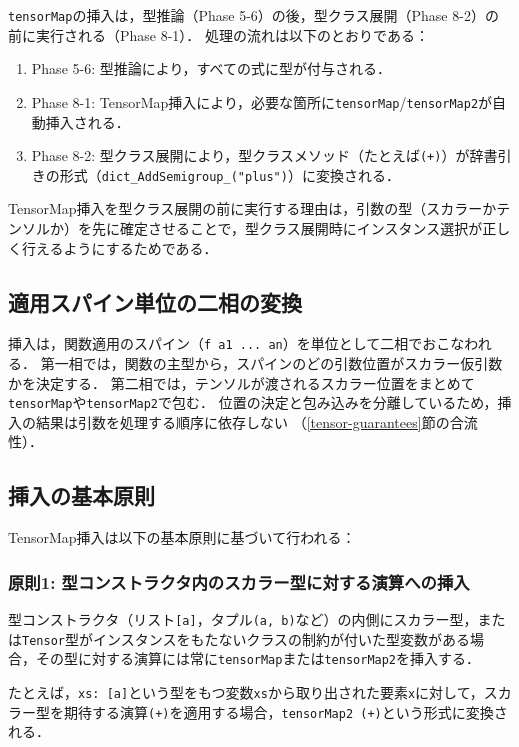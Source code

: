 \lstinline{tensorMap}の挿入は，型推論（Phase 5-6）の後，型クラス展開（Phase 8-2）の前に実行される（Phase 8-1）．
処理の流れは以下のとおりである：

\begin{enumerate}
\item Phase 5-6: 型推論により，すべての式に型が付与される．
\item Phase 8-1: TensorMap挿入により，必要な箇所に\lstinline{tensorMap}/\lstinline{tensorMap2}が自動挿入される．
\item Phase 8-2: 型クラス展開により，型クラスメソッド（たとえば\lstinline{(+)}）が辞書引きの形式（\lstinline{dict_AddSemigroup_("plus")}）に変換される．
\end{enumerate}

TensorMap挿入を型クラス展開の前に実行する理由は，引数の型（スカラーかテンソルか）を先に確定させることで，型クラス展開時にインスタンス選択が正しく行えるようにするためである．

\subsection{適用スパイン単位の二相の変換}

挿入は，関数適用のスパイン（\lstinline{f a1 ... an}）を単位として二相でおこなわれる．
第一相では，関数の主型から，スパインのどの引数位置がスカラー仮引数かを決定する．
第二相では，テンソルが渡されるスカラー位置をまとめて\lstinline{tensorMap}や\lstinline{tensorMap2}で包む．
位置の決定と包み込みを分離しているため，挿入の結果は引数を処理する順序に依存しない
（\ref{tensor-guarantees}節の合流性）．

\subsection{挿入の基本原則}

TensorMap挿入は以下の基本原則に基づいて行われる：

\subsubsection{原則1: 型コンストラクタ内のスカラー型に対する演算への挿入}

型コンストラクタ（リスト\lstinline{[a]}，タプル\lstinline{(a, b)}など）の内側にスカラー型，または\lstinline{Tensor}型がインスタンスをもたないクラスの制約が付いた型変数がある場合，その型に対する演算には常に\lstinline{tensorMap}または\lstinline{tensorMap2}を挿入する．

たとえば，\lstinline{xs: [a]}という型をもつ変数\lstinline{xs}から取り出された要素\lstinline{x}に対して，スカラー型を期待する演算\lstinline{(+)}を適用する場合，\lstinline{tensorMap2 (+)}という形式に変換される．

